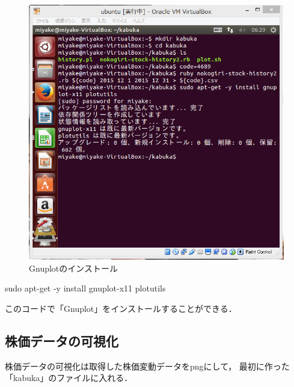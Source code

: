 {\begin{figure}[H]
\centering
\includegraphics[width=15cm]{gnuplot.PNG}
\caption{Gnuplotのインストール}\label{サンプル図}
\end{figure}


sudo apt-get -y install gnuplot-x11 plotutils

このコードで「Gnuplot」をインストールすることができる．


\subsection{株価データの可視化}
株価データの可視化は取得した株価変動データをpngにして，
最初に作った「kabuka」のファイルに入れる．


}
